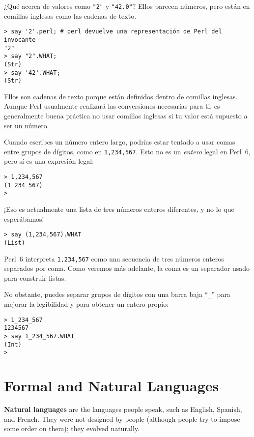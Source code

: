 ¿Qué acerca de valores como \verb'"2"' y \verb'"42.0"'?
Ellos parecen números, pero están en comillas inglesas como las 
cadenas de texto.

\begin{verbatim}
> say '2'.perl; # perl devuelve una representación de Perl del invocante
"2"
> say "2".WHAT;
(Str)
> say '42'.WHAT;
(Str)
\end{verbatim}
%

Ellos son cadenas de texto porque están definidos dentro de comillas inglesas.
Aunque Perl usualmente realizará las conversiones necesarias para ti, es generalmente
buena práctica no usar comillas inglesas si tu valor está supuesto a ser un
número.

Cuando escribes un número entero largo, podrías estar tentado a usar comas
entre grupos de dígitos, como en {\tt 1,234,567}. Esto no es un {\em entero}
legal en Perl~6, pero sí es una expresión legal:

\begin{verbatim}
> 1,234,567
(1 234 567)
>
\end{verbatim}
%
¡Eso es actualmente una lista de tres números enteros diferentes, 
y no lo que esperábamos! 

\begin{verbatim}
> say (1,234,567).WHAT
(List)
\end{verbatim}

Perl~6 interpreta {\tt 1,234,567} como una secuencia de tres números enteros
separados por coma. Como veremos más adelante, la coma es un separador usado
para construir listas.

No obstante, puedes separar grupos de dígitos con una barra baja ``\verb"_"''
para mejorar la legibilidad y para obtener un entero propio:

\begin{verbatim}
> 1_234_567
1234567
> say 1_234_567.WHAT
(Int)
>
\end{verbatim}
%




\section{Formal and Natural Languages}

{\bf Natural languages} are the languages people speak,
such as English, Spanish, and French.  They were not designed
by people (although people try to impose some order on them);
they evolved naturally.

